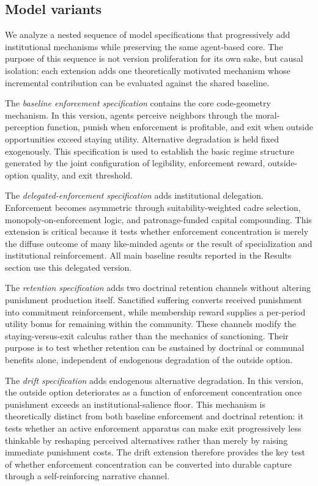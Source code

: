 \documentclass[12pt]{article}
\begin{document}
\subsection{Model variants}

We analyze a nested sequence of model specifications that progressively add institutional mechanisms while preserving the same agent-based core. The purpose of this sequence is not version proliferation for its own sake, but causal isolation: each extension adds one theoretically motivated mechanism whose incremental contribution can be evaluated against the shared baseline.

The \textit{baseline enforcement specification} contains the core code-geometry mechanism. In this version, agents perceive neighbors through the moral-perception function, punish when enforcement is profitable, and exit when outside opportunities exceed staying utility. Alternative degradation is held fixed exogenously. This specification is used to establish the basic regime structure generated by the joint configuration of legibility, enforcement reward, outside-option quality, and exit threshold.

The \textit{delegated-enforcement specification} adds institutional delegation. Enforcement becomes asymmetric through suitability-weighted cadre selection, monopoly-on-enforcement logic, and patronage-funded capital compounding. This extension is critical because it tests whether enforcement concentration is merely the diffuse outcome of many like-minded agents or the result of specialization and institutional reinforcement. All main baseline results reported in the Results section use this delegated version.

The \textit{retention specification} adds two doctrinal retention channels without altering punishment production itself. Sanctified suffering converts received punishment into commitment reinforcement, while membership reward supplies a per-period utility bonus for remaining within the community. These channels modify the staying-versus-exit calculus rather than the mechanics of sanctioning. Their purpose is to test whether retention can be sustained by doctrinal or communal benefits alone, independent of endogenous degradation of the outside option.

The \textit{drift specification} adds endogenous alternative degradation. In this version, the outside option deteriorates as a function of enforcement concentration once punishment exceeds an institutional-salience floor. This mechanism is theoretically distinct from both baseline enforcement and doctrinal retention: it tests whether an active enforcement apparatus can make exit progressively less thinkable by reshaping perceived alternatives rather than merely by raising immediate punishment costs. The drift extension therefore provides the key test of whether enforcement concentration can be converted into durable capture through a self-reinforcing narrative channel.
\end{document}
